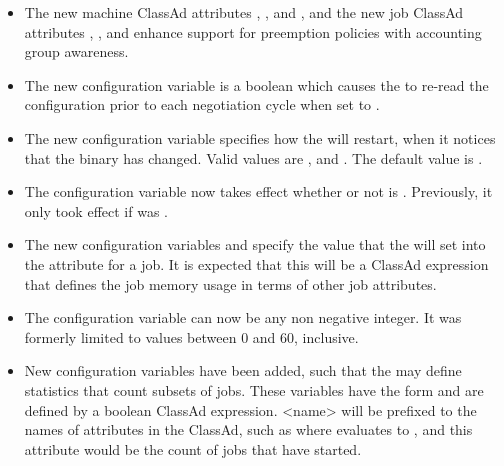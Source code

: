 \begin{itemize}

\item The new machine ClassAd attributes , 
, and ,
and the new job ClassAd attributes , 
, and 
enhance support for preemption policies with accounting group awareness.

\item The new configuration variable
 is a boolean which causes the
 to re-read the configuration prior to each
negotiation cycle when set to .

\item The new configuration variable  
specifies how the  will restart,
when it notices that the  binary has changed. 
Valid values are ,  and . 
The default value is .

\item The configuration variable  now takes effect
whether or not  is .  Previously,
it only took effect if  was .

\item The new configuration variables  and
 specify the value that the 
 will
set into the  attribute for a job.  It is expected that
this will be a ClassAd expression that defines the job memory usage in terms
of other job attributes.

\item The configuration variable  can now be any
non negative integer.  It was formerly limited to values between 0 and 60,
inclusive.

\item New configuration variables have been added, 
such that the  may
define statistics that count subsets of jobs. 
These variables
have the form  and 
are defined by a boolean ClassAd expression.
<name> will be prefixed to the names of attributes in the  
ClassAd, such as 
where  evaluates to ,
and this attribute would be the count of jobs that have started.


\end{itemize}
